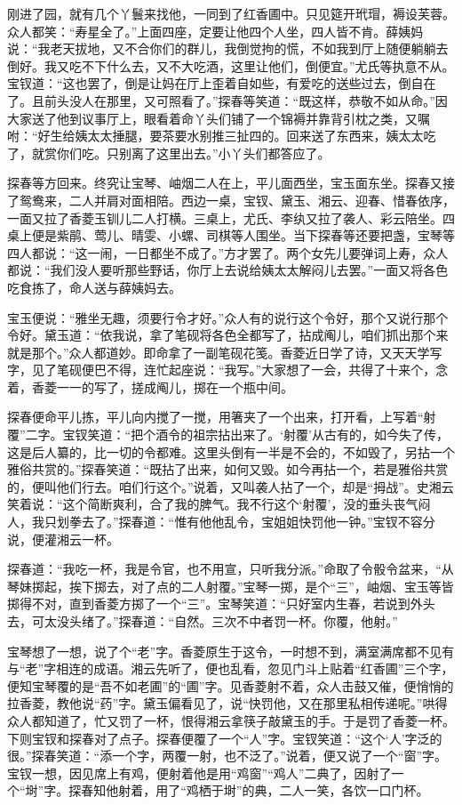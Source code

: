 \documentclass[12pt,oneside]{book}
\begin{document}
刚进了园，就有几个丫鬟来找他，一同到了红香圃中。只见筵开玳瑁，褥设芙蓉。众人都笑：“寿星全了。”上面四座，定要让他四个人坐，四人皆不肯。薛姨妈说：“我老天拔地，又不合你们的群儿，我倒觉拘的慌，不如我到厅上随便躺躺去倒好。我又吃不下什么去，又不大吃酒，这里让他们，倒便宜。”尤氏等执意不从。宝钗道：“这也罢了，倒是让妈在厅上歪着自如些，有爱吃的送些过去，倒自在了。且前头没人在那里，又可照看了。”探春等笑道：“既这样，恭敬不如从命。”因大家送了他到议事厅上，眼看着命丫头们铺了一个锦褥并靠背引枕之类，又嘱咐：“好生给姨太太捶腿，要茶要水别推三扯四的。回来送了东西来，姨太太吃了，就赏你们吃。只别离了这里出去。”小丫头们都答应了。

探春等方回来。终究让宝琴、岫烟二人在上，平儿面西坐，宝玉面东坐。探春又接了鸳鸯来，二人并肩对面相陪。西边一桌，宝钗、黛玉、湘云、迎春、惜春依序，一面又拉了香菱玉钏儿二人打横。三桌上，尤氏、李纨又拉了袭人、彩云陪坐。四桌上便是紫鹃、莺儿、晴雯、小螺、司棋等人围坐。当下探春等还要把盏，宝琴等四人都说：“这一闹，一日都坐不成了。”方才罢了。两个女先儿要弹词上寿，众人都说：“我们没人要听那些野话，你厅上去说给姨太太解闷儿去罢。”一面又将各色吃食拣了，命人送与薛姨妈去。

宝玉便说：“雅坐无趣，须要行令才好。”众人有的说行这个令好，那个又说行那个令好。黛玉道：“依我说，拿了笔砚将各色全都写了，拈成阄儿，咱们抓出那个来就是那个。”众人都道妙。即命拿了一副笔砚花笺。香菱近日学了诗，又天天学写字，见了笔砚便巴不得，连忙起座说：“我写。”大家想了一会，共得了十来个，念着，香菱一一的写了，搓成阄儿，掷在一个瓶中间。

探春便命平儿拣，平儿向内搅了一搅，用箸夹了一个出来，打开看，上写着“射覆”二字。宝钗笑道：“把个酒令的祖宗拈出来了。‘射覆’从古有的，如今失了传，这是后人纂的，比一切的令都难。这里头倒有一半是不会的，不如毁了，另拈一个雅俗共赏的。”探春笑道：“既拈了出来，如何又毁。如今再拈一个，若是雅俗共赏的，便叫他们行去。咱们行这个。”说着，又叫袭人拈了一个，却是“拇战”。史湘云笑着说：“这个简断爽利，合了我的脾气。我不行这个‘射覆’，没的垂头丧气闷人，我只划拳去了。”探春道：“惟有他他乱令，宝姐姐快罚他一钟。”宝钗不容分说，便灌湘云一杯。

探春道：“我吃一杯，我是令官，也不用宣，只听我分派。”命取了令骰令盆来，“从琴妹掷起，挨下掷去，对了点的二人射覆。”宝琴一掷，是个“三”，岫烟、宝玉等皆掷得不对，直到香菱方掷了一个“三”。宝琴笑道：“只好室内生春，若说到外头去，可太没头绪了。”探春道：“自然。三次不中者罚一杯。你覆，他射。”

宝琴想了一想，说了个“老”字。香菱原生于这令，一时想不到，满室满席都不见有与“老”字相连的成语。湘云先听了，便也乱看，忽见门斗上贴着“红香圃”三个字，便知宝琴覆的是“吾不如老圃”的“圃”字。见香菱射不着，众人击鼓又催，便悄悄的拉香菱，教他说“药”字。黛玉偏看见了，说“快罚他，又在那里私相传递呢。”哄得众人都知道了，忙又罚了一杯，恨得湘云拿筷子敲黛玉的手。于是罚了香菱一杯。下则宝钗和探春对了点子。探春便覆了一个“人”字。宝钗笑道：“这个‘人’字泛的很。”探春笑道：“添一个字，两覆一射，也不泛了。”说着，便又说了一个“窗”字。宝钗一想，因见席上有鸡，便射着他是用“鸡窗”“鸡人”二典了，因射了一个“埘”字。探春知他射着，用了“鸡栖于埘”的典，二人一笑，各饮一口门杯。
\end{document}
